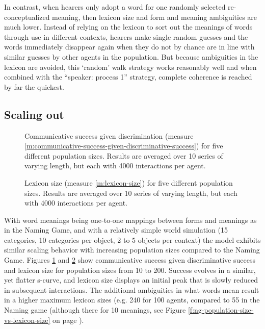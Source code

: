 In contrast, when hearers only adopt a word for one randomly selected
re-conceptualized meaning, then lexicon size and form and meaning
ambiguities are much lower. Instead of relying on the lexicon to sort
out the meanings of words through use in different contexts, hearers
make single random guesses and the words immediately disappear again
when they do not by chance are in line with similar guesses by other
agents in the population. But because ambiguities in the lexicon are
avoided, this `random' walk strategy works reasonably well and when
combined with the ``speaker: process 1'' strategy, complete coherence
is reached by far the quickest.


\subsection{Scaling out}

\startfiguregroup

\begin{figure}[t]
  \caption{Communi\-cative success given discrimination (measure
    \ref{m:communicative-success-given-discriminative-success}) for
    five different population sizes. Results are averaged over 10
    series of varying length, but each with 4000 interactions per
    agent.}
  \label{f:sgg-sw-unstructured-population-size-vs-communicative-success-given-discriminative-success}
\end{figure}


\begin{figure}[t]
  \caption{Lexicon size (measure \ref{m:lexicon-size}) for five
    different population sizes. Results are averaged over 10 series of
    varying length, but each with 4000 interactions per agent.}
  \label{f:sgg-sw-unstructured-population-size-vs-lexicon-size}
\end{figure}

\stopfiguregroup

With word meanings being one-to-one mappings between forms and
meanings as in the Naming Game, and with a relatively simple world
simulation (15 categories, 10 categories per object, 2 to 5 objects
per context) the model exhibits similar scaling behavior with
increasing population sizes compared to the Naming Game. Figures
\ref{f:sgg-sw-unstructured-population-size-vs-communicative-success-given-discriminative-success}
and \ref{f:sgg-sw-unstructured-population-size-vs-lexicon-size} show
communicative success given discriminative success and lexicon size
for population sizes from 10 to 200. Success evolves in a similar, yet
flatter s-curve, and lexicon size displays an initial peak that is
slowly reduced in subsequent interactions. The additional ambiguities
in what words mean result in a higher maximum lexicon sizes (e.g. 240
for 100 agents, compared to 55 in the Naming game (although there for
10 meanings, see Figure \ref{f:ng-population-size-vs-lexicon-size} on
page \pageref{f:ng-population-size-vs-lexicon-size}).\\



